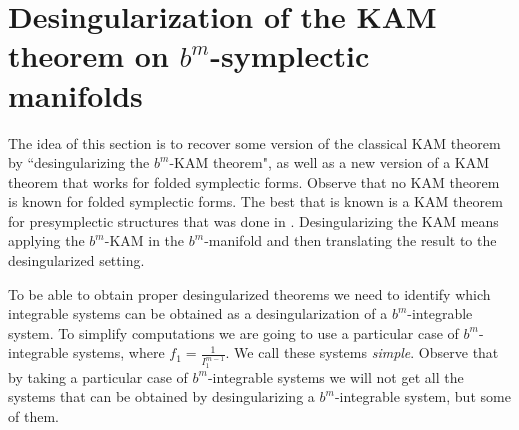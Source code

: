 


\chapter[$b^m$-KAM Desingularization]{Desingularization of the KAM theorem on $b^m$-symplectic manifolds}

The idea of this section is to recover some version of the classical KAM theorem by ``desingularizing the $b^m$-KAM theorem", as well as a new version of a KAM theorem that works for folded symplectic forms. Observe that no KAM theorem is known for folded symplectic forms. The best that is known is a KAM theorem for presymplectic structures that was done in \cite{presymplectic}. Desingularizing the KAM means applying the $b^m$-KAM in the $b^m$-manifold and then translating the result to the desingularized setting.

To be able to obtain proper desingularized theorems we need to identify which integrable systems can be obtained as a desingularization of a $b^m$-integrable system. To simplify computations we are going to use a particular case of $b^m$-integrable systems, where $f_1=\frac{1}{I_1^{m-1}}$. We call these systems \emph{simple}. Observe that by taking a particular case of $b^m$-integrable systems we will not get all the systems that can be obtained by desingularizing a $b^m$-integrable system, but some of them.

